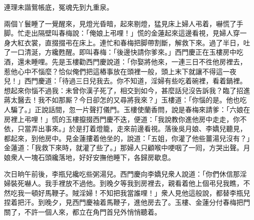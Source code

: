 \begin{myquote} 
連理未諧鴛帳底，冤魂先到九重泉。
\end{myquote} 

兩個丫鬟睡了一覺醒來，見燈光昏暗，起來剔燈，猛見床上婦人弔着，嚇慌了手脚。忙走出隔壁叫春梅說：「俺娘上弔哩！」慌的金蓮起來這邊看視，見婦人穿一身大紅衣裳，直掇掇弔在床上。連忙和春梅把脚帶割斷，解救下來。過了半日，吐了一口清涎，方纔甦醒。即叫春梅：「後邊快請你爹來。」西門慶正在玉樓房中吃酒，還未睡哩。先是玉樓勸西門慶說道：「你娶將他來，一連三日不徃他房裡去，惹他心中不惱麼？恰似俺們把這樁事放在頭裡一般，頭上末下就讓不得這一夜兒！」西門慶道：「待過三日兒我去。你不知道，淫婦有些吃着碗裡，看着鍋裡。想起來你惱不過我：未曾你漢子死了，相交到如今，甚麼話兒沒告訴我？臨了招進蔣太醫去！我不如那厮？今日卻怎的又尋將我來？」玉樓道：「你惱的是。他也吃人騙了。」正說話間，忽一片聲打儀門。玉樓使蘭香問，說是春梅來請爹：「六娘在房裡上弔哩！」慌的玉樓攛掇西門慶不迭，便道：「我說教你進他房中走走，你不依，只當弄出事來。」於是打着燈籠，走來前邊看視。落後吳月娘、李嬌兒聽見，都起來，到他房中。見金蓮摟着他坐的，說道：「五姐，你灌了他些薑湯兒沒有？」金蓮道：「我救下來時，就灌了些了。」那婦人只顧喉中哽咽了一囘，方哭出聲。月娘衆人一塊石頭纔落地，好好安撫他睡下，各歸房歇息。

次日晌午前後，李瓶兒纔吃些粥湯兒。西門慶向李嬌兒衆人說道：「你們休信那淫婦裝死嚇人。我手裡放不過他。到晚夕等我到房裡去，親看着他上個弔兒我瞧，不然吃我一頓好馬鞭子。賊淫婦！不知把我當誰哩！」衆人見他這般說，都替李瓶兒捏着把汗。到晚夕，見西門慶袖着馬鞭子，進他房去了。玉樓、金蓮分付春梅把門關了，不許一個人來，都立在角門首兒外悄悄聽着。


